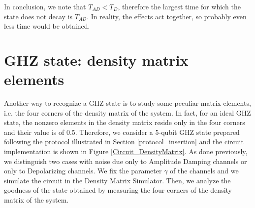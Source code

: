 In conclusion, we note that $T_{AD} < T_{D}$, therefore the largest time for which the state does not decay is $T_{AD}$. In reality, the effects act together, so probably even less time would be obtained.

\section{GHZ state: density matrix elements}

Another way to recognize a GHZ state is to study some peculiar matrix elements, i.e. the four corners of the density matrix of the system. In fact, for an ideal GHZ state, the nonzero elements in the density matrix reside only in the four corners and their value is of 0.5. Therefore, we consider a 5-qubit GHZ state prepared following the protocol illustrated in Section \ref{protocol_insertion} and the circuit implementation is shown in Figure \ref{Circuit_DensityMatrix}. As done previously, we distinguish two cases with noise due only to Amplitude Damping channels or only to Depolarizing channels.  We fix the parameter $\gamma$ of the channels and we simulate the circuit in the Density Matrix Simulator. Then, we analyze the goodness of the state obtained by measuring the four corners of the density matrix of the system. 

